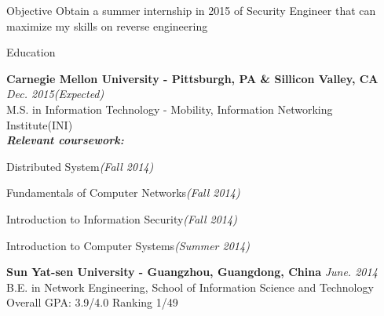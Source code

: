 \documentclass{resume} %
\begin{document}
\begin{rSection}{Objective}
Obtain a summer internship in 2015 of Security Engineer that can maximize my skills on reverse engineering 

\end{rSection}


\begin{rSection}{Education}

{\bf Carnegie Mellon University - Pittsburgh, PA \& Sillicon Valley, CA} \hfill {\em Dec. 2015(Expected)} \\ 
M.S. in Information Technology - Mobility, Information Networking Institute(INI) \\
{\bf\em Relevant coursework:}
\begin{inparaenum}[\itshape 1\upshape)]
\item Distributed System{\em(Fall 2014)}
\item Fundamentals of Computer Networks{\em(Fall 2014)}
\item Introduction to Information Security{\em(Fall 2014)}
\item Introduction to Computer Systems{\em(Summer 2014)}
\end{inparaenum}


{\bf Sun Yat-sen University - Guangzhou, Guangdong, China} \hfill {\em June. 2014} \\ 
B.E. in Network Engineering, 
School of Information Science and Technology \\
Overall GPA: 3.9/4.0 Ranking 1/49

\end{rSection}
\end{document}
